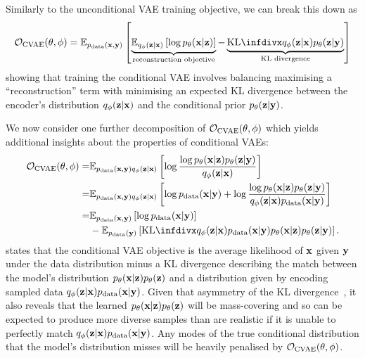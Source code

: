 Similarly to the unconditional VAE training objective, we can break this down as
\begin{align} \label{eq:conditional-vae-objective}
    \gO_\text{CVAE}(\theta, \phi) = \EX_{\pdata(\rvx,\rvy)} \left[ \underbrace{\EX_{q_\phi(\rvz|\rvx)}\left[\log p_\theta(\rvx|\rvz) \right]}_\text{reconstruction objective} - \underbrace{\kl{q_\phi(\rvz|\rvx)}{p_\theta(\rvz|\rvy)}}_\text{KL divergence} \right]
\end{align}
showing that training the conditional VAE involves balancing maximising a ``reconstruction'' term with minimising an expected KL divergence between the encoder's distribution $q_\phi({\mathbf{z}}|{\mathbf{x}})$ and the conditional prior $p_\theta({\mathbf{z}}|{\mathbf{y}})$.

We now consider one further decomposition of ${\mathcal{O}}_\text{CVAE}(\theta, \phi)$ which yields additional insights about the properties of conditional VAEs:
\begin{align}
    \gO_\text{CVAE}(\theta, \phi) =& \EX_{\pdata(\rvx,\rvy)q_\phi(\rvz|\rvx)} \left[ \log \frac{\log p_\theta(\rvx|\rvz)p_\theta(\rvz|\rvy)}{q_\phi(\rvz|\rvx)} \right] \\
    =& \EX_{\pdata(\rvx,\rvy)q_\phi(\rvz|\rvx)} \left[ \log \pdata(\rvx|\rvy) + \log \frac{\log p_\theta(\rvx|\rvz)p_\theta(\rvz|\rvy)}{q_\phi(\rvz|\rvx)\pdata(\rvx|\rvy)} \right] \\
    \label{eq:elbo-kl-joints}
    =& \EX_{\pdata(\rvx,\rvy)} \left[ \log \pdata(\rvx|\rvy) \right] \\
    &- \EX_{\pdata(\rvy)} \left[ \kl{q_\phi(\rvz|\rvx)\pdata(\rvx|\rvy)}{p_\theta(\rvx|\rvz)p_\theta(\rvz|\rvy)} \right] \nonumber .
\end{align}
 states that the conditional VAE objective is the average likelihood of ${\mathbf{x}}$ given ${\mathbf{y}}$ under the data distribution minus a KL divergence describing the match between the model's distribution $p_\theta({\mathbf{x}}|{\mathbf{z}})p_\theta({\mathbf{z}})$ and a distribution given by encoding sampled data $q_\phi({\mathbf{z}}|{\mathbf{x}})p_{\rm{data}}({\mathbf{x}}|{\mathbf{y}})$. Given that asymmetry of the KL divergence~\citep{bishop2006pattern}, it also reveals that the learned $p_\theta({\mathbf{x}}|{\mathbf{z}})p_\theta({\mathbf{z}})$ will be mass-covering and so can be expected to produce more diverse samples than are realistic if it is unable to perfectly match $q_\phi({\mathbf{z}}|{\mathbf{x}})p_{\rm{data}}({\mathbf{x}}|{\mathbf{y}})$. Any modes of the true conditional distribution that the model's distribution misses will be heavily penalised by ${\mathcal{O}}_\text{CVAE}(\theta,\phi)$. 

